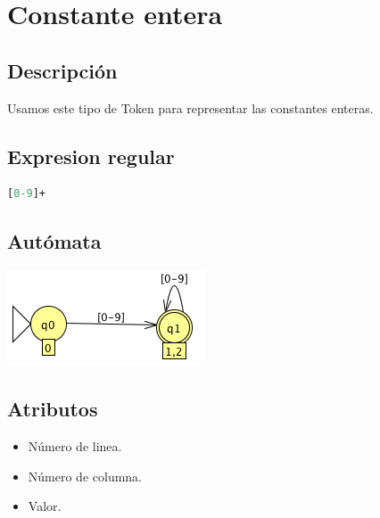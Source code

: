             \hfill
            \clearpage
            



	\section{Constante entera}
    
        \subsection{Descripción}
        
            Usamos este tipo de Token para representar las constantes enteras.
        
        \subsection{Expresion regular}
        
            \begin{lstlisting}[language=Perl]
[0-9]+
            \end{lstlisting}

        \subsection{Autómata}
        
	        \includegraphics[scale=.7]{../Design/jflap/Constante_entera.png}

        \subsection{Atributos}
        
            \begin{itemize}
                \item Número de linea.
                \item Número de columna.
                \item Valor.
            \end{itemize}

            \hfill
            \clearpage
            
